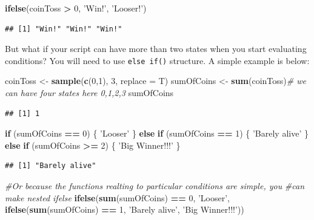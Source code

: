 \documentclass[]{book}
\newenvironment{Shaded}{\begin{snugshade}}{\end{snugshade}}
\newcommand{\KeywordTok}[1]{\textcolor[rgb]{0.13,0.29,0.53}{\textbf{#1}}}
\newcommand{\DataTypeTok}[1]{\textcolor[rgb]{0.13,0.29,0.53}{#1}}
\newcommand{\DecValTok}[1]{\textcolor[rgb]{0.00,0.00,0.81}{#1}}
\newcommand{\StringTok}[1]{\textcolor[rgb]{0.31,0.60,0.02}{#1}}
\newcommand{\CommentTok}[1]{\textcolor[rgb]{0.56,0.35,0.01}{\textit{#1}}}
\newcommand{\ControlFlowTok}[1]{\textcolor[rgb]{0.13,0.29,0.53}{\textbf{#1}}}
\newcommand{\OperatorTok}[1]{\textcolor[rgb]{0.81,0.36,0.00}{\textbf{#1}}}
\newcommand{\NormalTok}[1]{#1}
\theoremstyle{definition}
\theoremstyle{definition}
\theoremstyle{definition}
\theoremstyle{remark}
\begin{document}
\begin{Shaded}
\begin{Highlighting}[]
\KeywordTok{ifelse}\NormalTok{(coinToss }\OperatorTok{>}\StringTok{ }\DecValTok{0}\NormalTok{, }\StringTok{'Win!'}\NormalTok{, }\StringTok{'Looser!'}\NormalTok{)}
\end{Highlighting}
\end{Shaded}

\begin{verbatim}
## [1] "Win!" "Win!" "Win!"
\end{verbatim}

But what if your script can have more than two states when you start
evaluating conditions? You will need to use \texttt{else\ if()}
structure. A simple example is below:

\begin{Shaded}
\begin{Highlighting}[]
\NormalTok{coinToss <-}\StringTok{ }\KeywordTok{sample}\NormalTok{(}\KeywordTok{c}\NormalTok{(}\DecValTok{0}\NormalTok{,}\DecValTok{1}\NormalTok{), }\DecValTok{3}\NormalTok{, }\DataTypeTok{replace =}\NormalTok{ T)}
\NormalTok{sumOfCoins <-}\StringTok{ }\KeywordTok{sum}\NormalTok{(coinToss)}\CommentTok{# we can have four states here 0,1,2,3}
\NormalTok{sumOfCoins}
\end{Highlighting}
\end{Shaded}

\begin{verbatim}
## [1] 1
\end{verbatim}

\begin{Shaded}
\begin{Highlighting}[]
\ControlFlowTok{if}\NormalTok{ (sumOfCoins }\OperatorTok{==}\StringTok{ }\DecValTok{0}\NormalTok{) \{}
  \StringTok{'Looser'}
\NormalTok{\} }\ControlFlowTok{else} \ControlFlowTok{if}\NormalTok{ (sumOfCoins }\OperatorTok{==}\StringTok{ }\DecValTok{1}\NormalTok{) \{}
  \StringTok{'Barely alive'}
\NormalTok{\} }\ControlFlowTok{else} \ControlFlowTok{if}\NormalTok{ (sumOfCoins }\OperatorTok{>=}\StringTok{ }\DecValTok{2}\NormalTok{) \{}
  \StringTok{'Big Winner!!!'}
\NormalTok{\}}
\end{Highlighting}
\end{Shaded}

\begin{verbatim}
## [1] "Barely alive"
\end{verbatim}

\begin{Shaded}
\begin{Highlighting}[]
\CommentTok{#Or because the functions realting to particular conditions are simple, you}
\CommentTok{#can make nested ifelse}
\KeywordTok{ifelse}\NormalTok{(}\KeywordTok{sum}\NormalTok{(sumOfCoins) }\OperatorTok{==}\StringTok{ }\DecValTok{0}\NormalTok{, }\StringTok{'Looser'}\NormalTok{,}
       \KeywordTok{ifelse}\NormalTok{(}\KeywordTok{sum}\NormalTok{(sumOfCoins) }\OperatorTok{==}\StringTok{ }\DecValTok{1}\NormalTok{, }\StringTok{'Barely alive'}\NormalTok{, }\StringTok{'Big Winner!!!'}\NormalTok{))}
\end{Highlighting}
\end{Shaded}
\end{document}
